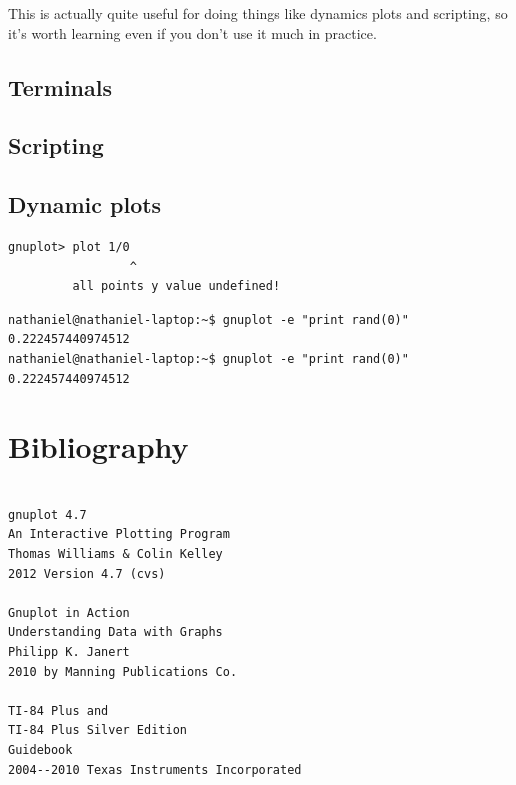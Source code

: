 \documentclass[11pt,letterpaper]{report}
\begin{document}
This is actually quite useful for doing things like dynamics plots and scripting, so it's worth learning even if you don't use it much in practice.



\section{Terminals}

\section{Scripting}

\section{Dynamic plots}

\begin{verbatim}
gnuplot> plot 1/0
                 ^
         all points y value undefined!

\end{verbatim}




\begin{verbatim}
nathaniel@nathaniel-laptop:~$ gnuplot -e "print rand(0)"
0.222457440974512
nathaniel@nathaniel-laptop:~$ gnuplot -e "print rand(0)"
0.222457440974512
\end{verbatim}


\chapter{Bibliography}
\begin{verbatim}

gnuplot 4.7
An Interactive Plotting Program
Thomas Williams & Colin Kelley
2012 Version 4.7 (cvs)

Gnuplot in Action
Understanding Data with Graphs
Philipp K. Janert
2010 by Manning Publications Co.

TI-84 Plus and
TI-84 Plus Silver Edition
Guidebook
2004--2010 Texas Instruments Incorporated

\end{verbatim}
\end{document}
